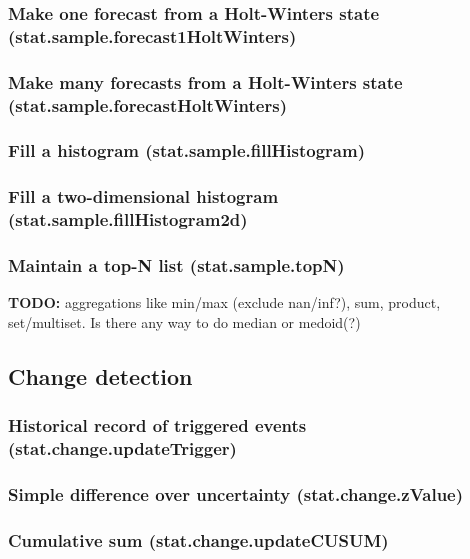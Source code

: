 \documentclass{article}
\theoremstyle{definition}
\begin{document}
\subsubsection{Make one forecast from a Holt-Winters state (stat.sample.forecast1HoltWinters)}

\subsubsection{Make many forecasts from a Holt-Winters state (stat.sample.forecastHoltWinters)}

\subsubsection{Fill a histogram (stat.sample.fillHistogram)}

\subsubsection{Fill a two-dimensional histogram (stat.sample.fillHistogram2d)}

\subsubsection{Maintain a top-N list (stat.sample.topN)}

{\bf TODO:} aggregations like min/max (exclude nan/inf?), sum, product, set/multiset.  Is there any way to do median or medoid(?)

\subsection{Change detection}

\subsubsection{Historical record of triggered events (stat.change.updateTrigger)}

\subsubsection{Simple difference over uncertainty (stat.change.zValue)}

\subsubsection{Cumulative sum (stat.change.updateCUSUM)}
\end{document}
